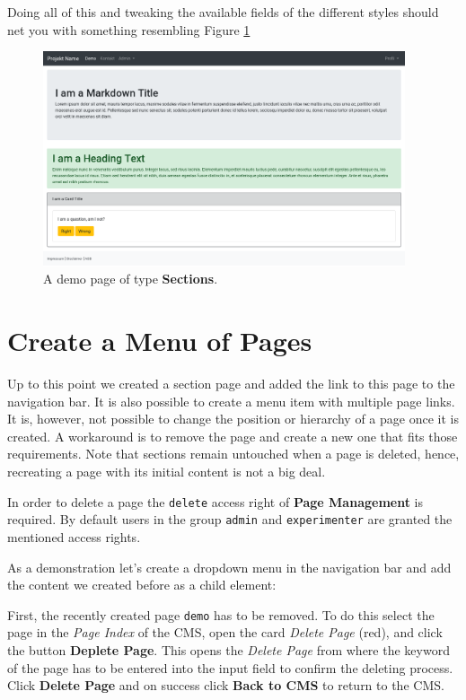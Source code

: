 \documentclass[a4paper,oneside]{book}
\begin{document}
Doing all of this and tweaking the available fields of the different styles should net you with something resembling Figure \ref{fig.demo}

\begin{figure}[ht]
    \centering
    \includegraphics[width=0.95\textwidth]{demo.png}
    \caption{A demo page of type \textbf{Sections}.}
    \label{fig.demo}
\end{figure}

\section{Create a Menu of Pages}
Up to this point we created a section page and added the link to this page to the navigation bar.
It is also possible to create a menu item with multiple page links.
It is, however, not possible to change the position or hierarchy of a page once it is created.
A workaround is to remove the page and create a new one that fits those requirements.
Note that sections remain untouched when a page is deleted, hence, recreating a page with its initial content is not a big deal.

In order to delete a page the \texttt{delete} access right of \textbf{Page Management} is required.
By default users in the group \texttt{admin} and \texttt{experimenter} are granted the mentioned access rights.

As a demonstration let's create a dropdown menu in the navigation bar and add the content we created before as a child element:

First, the recently created page \texttt{demo} has to be removed.
To do this select the page in the \emph{Page Index} of the CMS, open the card \emph{Delete Page} (red), and click the button \textbf{Deplete Page}.
This opens the \emph{Delete Page} from where the keyword of the page has to be entered into the input field to confirm the deleting process.
Click \textbf{Delete Page} and on success click \textbf{Back to CMS} to return to the CMS.
\end{document}
